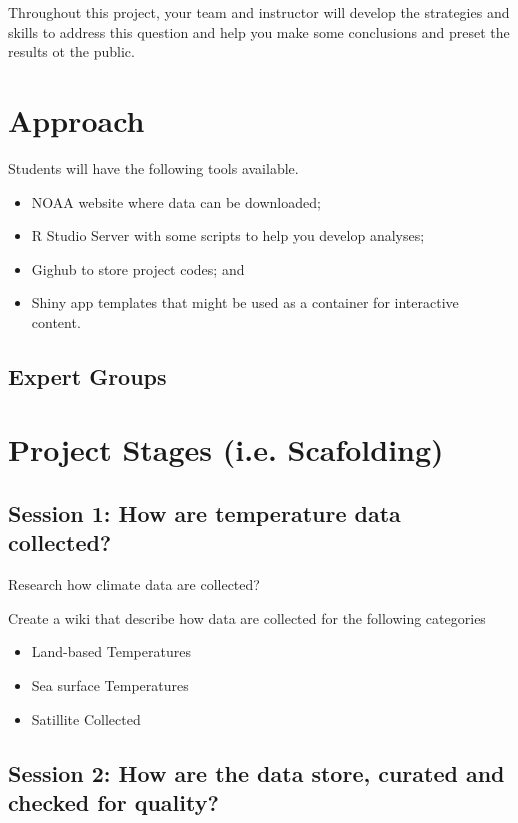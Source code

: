 \documentclass{article}\usepackage[]{graphicx}\usepackage[]{color}
\begin{document}
Throughout this project, your team and instructor will develop the strategies and skills to address this question and help you make some conclusions and preset the results ot the public.


\section{Approach}

Students will have the following tools available.

\begin{itemize}
  \item NOAA website where data can be downloaded;
  \item R Studio Server with some scripts to help you develop analyses;
  \item Gighub to store project codes; and
  \item Shiny app templates that might be used as a container for interactive content.
\end{itemize}

\subsection{Expert Groups}



\section{Project Stages (i.e. Scafolding)}

\subsection{Session 1: How are temperature data collected?}

Research how climate data are collected?

Create a wiki that describe how data are collected for the following categories

\begin{itemize}
  \item Land-based Temperatures
  \item Sea surface Temperatures
  \item Satillite Collected 
\end{itemize}

\subsection{Session 2: How are the data store, curated and checked for quality?}
\end{document}
